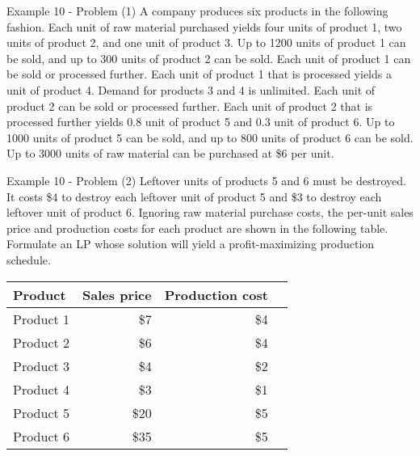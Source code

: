 \begin{frame}{Example 10 - Problem (1)}
A company produces six products in the following fashion. Each unit of raw
material purchased yields four units of product 1, two units of product 2, and
one unit of product 3. Up to 1200 units of product 1 can be sold, and up to 300
units of product 2 can be sold. Each unit of product 1 can be sold or processed
further. Each unit of product 1 that is processed yields a unit of product 4.
Demand for products 3 and 4 is unlimited. Each unit of product 2 can be sold or
processed further. Each unit of product 2 that is processed further yields 0.8
unit of product 5 and 0.3 unit of product 6. Up to 1000 units of product 5 can
be sold, and up to 800 units of product 6 can be sold. Up to 3000 units of raw
material can be purchased at \$6 per unit.
\end{frame}

\begin{frame}{Example 10 - Problem (2)}
Leftover units of products 5 and 6 must be destroyed. It costs \$4 to destroy
each leftover unit of product 5 and \$3 to destroy each leftover unit of product
6. Ignoring raw material purchase costs, the per-unit sales price and production
costs for each product are shown in the following table. Formulate an LP whose
solution will yield a profit-maximizing production schedule.

\begin{center}
\begin{tabular}{lrrr}
\hline
  \cellcolor{gray90}\textbf{Product}
& \cellcolor{gray90}\textbf{Sales price}
& \cellcolor{gray90}\textbf{Production cost} \\
\hline
Product 1 &  \$7 & \$4 \\
Product 2 &  \$6 & \$4 \\
Product 3 &  \$4 & \$2 \\
Product 4 &  \$3 & \$1 \\
Product 5 & \$20 & \$5 \\
Product 6 & \$35 & \$5 \\
\hline
\end{tabular}
\end{center}

\end{frame}
